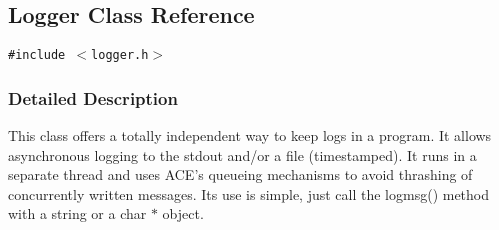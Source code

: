 \hypertarget{classLogger}{
\subsection{Logger Class Reference}
\label{classLogger}
}
{\tt \#include $<$logger.h$>$}



\subsubsection{Detailed Description}
This class offers a totally independent way to keep logs in a program. It allows asynchronous logging to the stdout and/or a file (timestamped). It runs in a separate thread and uses ACE's queueing mechanisms to avoid thrashing of concurrently written messages. Its use is simple, just call the logmsg() method with a string or a char $\ast$ object. 



